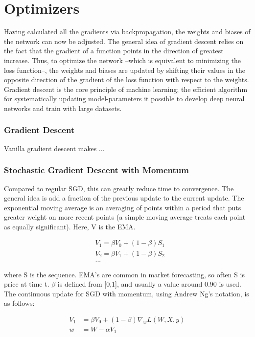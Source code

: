 \section{Optimizers}
Having calculated all the gradients via backpropagation, the weights and biases of the network can now be adjusted. The general idea of gradient descent relies on the fact that the gradient of a function points in the direction of greatest increase. Thus, to optimize the network --which is equivalent to minimizing the loss function--, the weights and biases are updated by shifting their values in the opposite direction of the gradient of the loss function with respect to the weights. Gradient descent is the core principle of machine learning; the efficient algorithm for systematically updating model-parameters it possible to develop deep neural networks and train with large datasets.

\subsubsection{Gradient Descent}
Vanilla gradient descent  \cite{gradient-descent-rev-article} makes ... 

\subsubsection{Stochastic Gradient Descent with Momentum}
Compared to regular SGD, this can greatly reduce time to convergence. The general idea is add a fraction of the previous update to the current update. The exponential moving average is an averaging of points within a period that puts greater weight on more recent points (a simple moving average treats each point as equally significant). Here, V is the EMA.

\begin{align}
    & V_1 = \beta V_0 + \left(1 - \beta \right) S_1 \\
    & V_2 = \beta V_1 + \left(1 - \beta \right) S_2 \\
    & ...
\end{align}

\noindent where S is the sequence. EMA's are common in market forecasting, so often S is price at time t.
$ \beta $ is defined from [0,1], and usually a value around 0.90 is used. The continuous update for SGD with momentum, using Andrew Ng's notation, is as follows:

\begin{align}
    V_1 &= \beta V_0  + \left( 1 - \beta \right) \nabla_w L \left( W, X, y \right)\\
    w &= W - \alpha V_1
\end{align}


